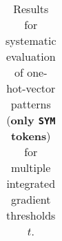 \begin{table}[t]
\begin{tabular}{lllllll}

\\ \hline
\end{tabular}
\caption[Model Evaluation for only \texttt{SYM} tokens]{Results for systematic evaluation of one-hot-vector patterns (\textbf{only \texttt{SYM} tokens}) for multiple integrated gradient thresholds $t$.}
\label{tab:evalResultsSYM}
\end{table}
	